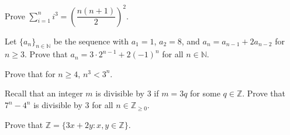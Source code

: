 \documentclass[11pt,letterpaper]{article}
\begin{document}
\homework{}

 Prove $\displaystyle \sum_{i=1}^n i^3= \left( \dfrac{n(n + 1)}{2} \right)^2$. 





\newpage





 Let $\{ a_n \}_{n \in \mathbb{N}}$ be the sequence with $a_1= 1$, $a_2= 8$, and $a_n= a_{n-1} + 2a_{n-2}$ for $n \geq 3$. Prove that $a_n= 3 \cdot 2^{n-1} + 2(-1)^n$ for all $n \in \mathbb{N}$. 





\newpage





 Prove that for $n \geq 4$, $n^3 < 3^n$. 





\newpage





 Recall that an integer $m$ is divisible by 3 if $m= 3q$ for some $q \in \mathbb{Z}$. Prove that $7^n - 4^n$ is divisible by 3 for all $n \in \mathbb{Z}_{\geq 0}$. 





\newpage





 Prove that $\mathbb{Z}= \{ 3x + 2y \colon x, y \in \mathbb{Z} \}$. 
\end{document}
